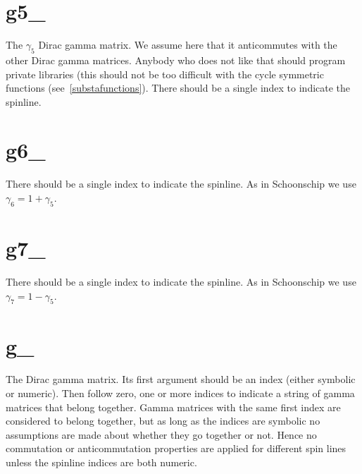
\section{g5\_}
\label{fungfive}
\noindent The $\gamma_5$ Dirac gamma matrix. We assume here that it 
anticommutes with the other Dirac gamma 
matrices. Anybody who does not like that should program private libraries 
(this should not be too difficult with the cycle symmetric functions 
(see~\ref{substafunctions}). There should be a single index to indicate 
the spinline.


\section{g6\_}
\label{fungsix}
\noindent There should be a single index to indicate the spinline. 
As in Schoonschip we use $\gamma_6 = 1+\gamma_5$.


\section{g7\_}
\label{fungseven}
\noindent There should be a single index to indicate the spinline. 
As in Schoonschip we use $\gamma_7 = 1-\gamma_5$.


\section{g\_}
\label{fung}
\noindent The Dirac gamma matrix. Its 
first argument should be an index (either symbolic or numeric). Then follow 
zero, one or more indices to indicate a string of gamma matrices that 
belong together. Gamma matrices with the same first index are considered to 
belong together, but as long as the indices are symbolic no assumptions are 
made about whether they go together or not. Hence no commutation or 
anticommutation properties are applied for different spin lines unless the 
spinline indices are both numeric.


